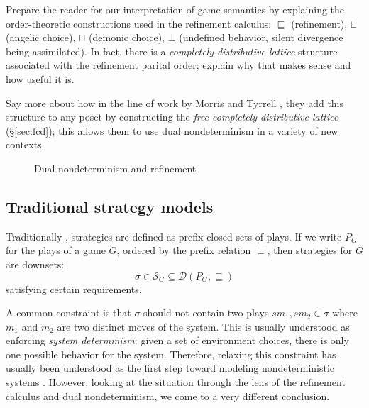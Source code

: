 \documentclass[format=sigplan,authordraft]{acmart}
\begin{document}
Prepare the reader for
our interpretation of game semantics
by explaining the order-theoretic constructions used
in the refinement calculus:
$\sqsubseteq$ (refinement),
$\sqcup$ (angelic choice),
$\sqcap$ (demonic choice),
$\bot$ (undefined behavior, silent divergence being assimilated).
In fact,
there is a \emph{completely distributive lattice} structure
associated with the refinement parital order;
explain why that makes sense
and how useful it is.

Say more about how in the line of work by Morris and Tyrrell
\cite{augtyp,dndf,cspdnd},
they add this structure to any poset
by constructing the
\emph{free completely distributive lattice} (\S\ref{sec:fcd});
this allows them to use dual nondeterminism
in a variety of new contexts.


\begin{figure}[h]
  \caption{Dual nondeterminism and refinement}
\end{figure}

\subsection{Traditional strategy models} \label{sec:strat} %

Traditionally \cite{gamesem99},
strategies are defined as
prefix-closed sets of plays.
If we write $P_G$ for the plays of a game $G$,
ordered by the prefix relation $\sqsubseteq$,
then strategies for $G$ are downsets:
\[
    \sigma \in
      \mathcal{S}_G \subseteq
      \mathcal{D}(P_G, {\sqsubseteq})
\]
satisfying certain requirements.

A common constraint is that $\sigma$
should not contain two plays $s m_1, s m_2 \in \sigma$
where $m_1$ and $m_2$ are two distinct moves of the system.
This is usually understood as
enforcing \emph{system determinism}:
given a set of environment choices,
there is only one possible behavior for the system.
Therefore,
relaxing this constraint has usually been understood
as the first step toward modeling nondeterministic systems
\cite{gsfnd}.
However,
looking at the situation through the lens of
the refinement calculus and dual nondeterminism,
we come to a very different conclusion.
\end{document}
